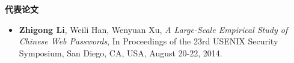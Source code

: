 \documentclass[letterpaper,10pt]{article}
\newcommand{\resheading}[1]{{\large \colorbox{mygrey}{\begin{minipage}{\textwidth}{\textbf{#1 \vphantom{p\^{E}}}}\end{minipage}}}}
\begin{document}




\resheading{代表论文}
\begin{itemize}
 \item
 \textbf{Zhigong Li}, Weili Han, Wenyuan Xu, \emph{A Large-Scale Empirical Study of Chinese Web Passwords}, In Proceedings of the 23rd {USENIX} Security Symposium, San Diego, CA, USA, August 20-22, 2014.

\end{itemize}




\end{document}
